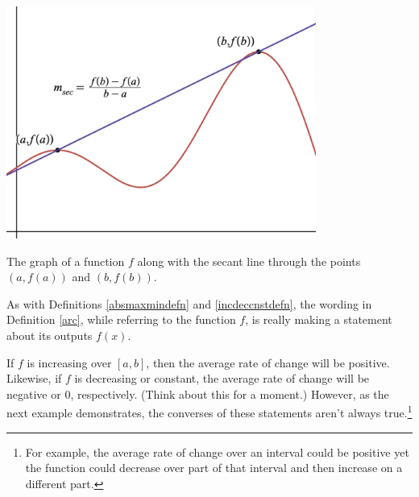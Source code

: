 \documentclass{ximera}
\begin{document}
\begin{center}
\includegraphics[width=4in]{./ConstantandLinearFunctionsGraphics/SecantLine.png}

The graph of a function $f$ along with the secant line through the points $(a, f(a))$ and $(b, f(b))$.

\end{center}

As with Definitions \ref{absmaxmindefn}  and \ref{incdeccnstdefn}, the wording in Definition \ref{arc}, while referring to the function $f$, is really making a statement about its outputs $f(x)$.  



If $f$ is increasing over $[a,b]$, then the average rate of change will be positive. Likewise, if $f$ is decreasing or constant, the average rate of change will be negative or $0$, respectively. (Think about this for a moment.) However, as the next example demonstrates, the converses of these statements aren't always true.\footnote{For example, the average rate of change over an interval could be positive yet the function could decrease over part of that interval and then increase on a different part.}
\end{document}
